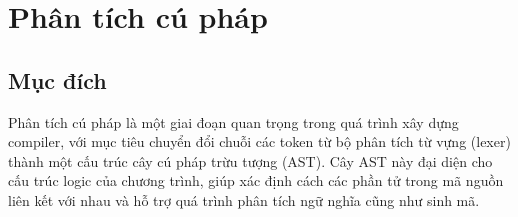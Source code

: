 \section{Phân tích cú pháp}
\subsection{Mục đích}
Phân tích cú pháp là một giai đoạn quan trọng trong quá trình xây dựng compiler, với mục tiêu chuyển đổi chuỗi các token từ bộ phân tích từ vựng (lexer) thành một cấu trúc cây cú pháp trừu tượng (AST). Cây AST này đại diện cho cấu trúc logic của chương trình, giúp xác định cách các phần tử trong mã nguồn liên kết với nhau và hỗ trợ quá trình phân tích ngữ nghĩa cũng như sinh mã.

\vspace{1cm}
\hspace{-1.5cm}
